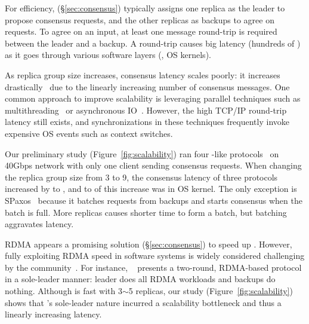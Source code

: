 For efficiency, \paxos (\S\ref{sec:consensus}) typically assigns one replica as 
the leader to propose consensus requests, and the other replicas as backups to 
agree on requests. To agree on an input, at least one message round-trip is 
required between the leader and a backup. A round-trip causes big latency 
(hundreds of \us) as it goes through various software layers (\eg, OS kernels).


As replica group size increases, \paxos consensus latency scales poorly: it increases
drastically~\cite{scatter:sosp11} due to the linearly increasing number of 
consensus messages. One common approach to improve \paxos scalability is 
leveraging parallel techniques such as multithreading~\cite{zookeeper, 
spaxos:srds12} or asynchronous IO~\cite{crane:sosp15, libpaxos}. However, the 
high TCP/IP round-trip latency still exists, and synchronizations in these 
techniques frequently invoke expensive OS events such as context switches.

Our preliminary study (Figure~\ref{fig:scalability}) ran four \paxos-like 
protocols~\cite{zookeeper, spaxos:srds12, crane:sosp15, libpaxos} on 40Gbps 
network with only one client sending consensus requests. When changing the 
replica group size from 3 to 9, the consensus latency of three protocols 
increased by \tradlatencyincreaselow to \tradlatencyincreasehigh, and 
\systemcostlow to \systemcosthigh of this increase was in OS kernel. The only
exception is S\-Paxos~\cite{spaxos:srds12} because it batches requests from backups
and starts consensus when the batch is full. More replicas causes shorter time
to form a batch, but batching aggravates latency.

RDMA appears a promising solution (\S\ref{sec:consensus}) to speed up \paxos. 
However, fully exploiting RDMA speed in software systems is widely considered 
challenging by the community~\cite{pilaf:usenix14,herd:sigcomm14,
farm:sosp15,dare:hpdc15}. For instance, \dare~\cite{dare:hpdc15} presents a
two-round, RDMA-based \paxos protocol in a sole-leader manner: leader does all 
RDMA workloads and backups do nothing. Although \dare is fast with 3$\sim$5 
replicas, our study (Figure~\ref{fig:scalability}) shows that \dare's sole-leader
nature incurred a scalability bottleneck and thus a linearly increasing 
latency.

